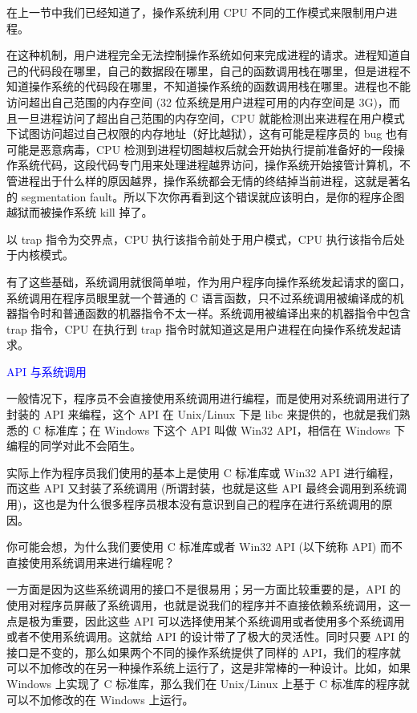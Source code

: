 \documentclass[utf8]{book}
\begin{document}
	在上一节中我们已经知道了，操作系统利用 CPU 不同的工作模式来限制用户进程。
	
	在这种机制，用户进程完全无法控制操作系统如何来完成进程的请求。进程知道自己的代码段在哪里，自己的数据段在哪里，自己的函数调用栈在哪里，但是进程不知道操作系统的代码段在哪里，不知道操作系统的函数调用栈在哪里。进程也不能访问超出自己范围的内存空间 (32 位系统是用户进程可用的内存空间是 3G)，而且一旦进程访问了超出自己范围的内存空间，CPU 就能检测出来进程在用户模式下试图访问超过自己权限的内存地址（好比越狱），这有可能是程序员的 bug 也有可能是恶意病毒，CPU 检测到进程切图越权后就会开始执行提前准备好的一段操作系统代码，这段代码专门用来处理进程越界访问，操作系统开始接管计算机，不管进程出于什么样的原因越界，操作系统都会无情的终结掉当前进程，这就是著名的 segmentation fault。所以下次你再看到这个错误就应该明白，是你的程序企图越狱而被操作系统 kill 掉了。
	
	以 trap 指令为交界点，CPU 执行该指令前处于用户模式，CPU 执行该指令后处于内核模式。
	
	有了这些基础，系统调用就很简单啦，作为用户程序向操作系统发起请求的窗口，系统调用在程序员眼里就一个普通的 C 语言函数，只不过系统调用被编译成的机器指令时和普通函数的机器指令不太一样。系统调用被编译出来的机器指令中包含 trap 指令，CPU 在执行到 trap 指令时就知道这是用户进程在向操作系统发起请求。
	
	\textcolor{blue}{API 与系统调用}
	
	
	一般情况下，程序员不会直接使用系统调用进行编程，而是使用对系统调用进行了封装的 API 来编程，这个 API 在 Unix/Linux 下是 libc 来提供的，也就是我们熟悉的 C 标准库；在 Windows 下这个 API 叫做 Win32 API，相信在 Windows 下编程的同学对此不会陌生。
	
	实际上作为程序员我们使用的基本上是使用 C 标准库或 Win32 API 进行编程，而这些 API 又封装了系统调用 (所谓封装，也就是这些 API 最终会调用到系统调用)，这也是为什么很多程序员根本没有意识到自己的程序在进行系统调用的原因。
	
	你可能会想，为什么我们要使用 C 标准库或者 Win32 API (以下统称 API) 而不直接使用系统调用来进行编程呢？
	
	一方面是因为这些系统调用的接口不是很易用；另一方面比较重要的是，API 的使用对程序员屏蔽了系统调用，也就是说我们的程序并不直接依赖系统调用，这一点是极为重要，因此这些 API 可以选择使用某个系统调用或者使用多个系统调用或者不使用系统调用。这就给 API 的设计带了了极大的灵活性。同时只要 API 的接口是不变的，那么如果两个不同的操作系统提供了同样的 API，我们的程序就可以不加修改的在另一种操作系统上运行了，这是非常棒的一种设计。比如，如果 Windows 上实现了 C 标准库，那么我们在 Unix/Linux 上基于 C 标准库的程序就可以不加修改的在 Windows 上运行。
	
\end{document}
